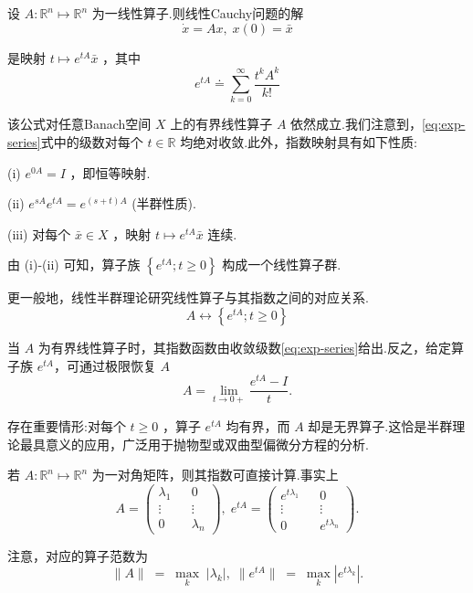 设 $A : {\mathbb{R}}^{n} \mapsto  {\mathbb{R}}^{n}$ 为一线性算子.则线性Cauchy问题的解
\begin{equation}\tag{7.8}\label{eq:linear-ode}
\dot{x} = {Ax},\;x\left( 0\right)  = \bar{x}
\end{equation}

是映射 $t \mapsto  {e}^{tA}\bar{x}$ ，其中
\begin{equation}\tag{7.9}\label{eq:exp-series}
{e}^{tA} \doteq  \mathop{\sum }\limits_{{k = 0}}^{\infty }\frac{{t}^{k}{A}^{k}}{k!}
\end{equation}

该公式对任意Banach空间 $X$ 上的有界线性算子 $A$ 依然成立.我们注意到，\eqref{eq:exp-series}式中的级数对每个 $t \in  \mathbb{R}$ 均绝对收敛.此外，指数映射具有如下性质:

(i) ${e}^{0A} = I$ ，即恒等映射.

(ii) ${e}^{sA}{e}^{tA} = {e}^{\left( {s + t}\right) A}$ (半群性质).

(iii) 对每个 $\bar{x} \in  X$ ，映射 $t \mapsto  {e}^{tA}\bar{x}$ 连续.

由 (i)-(ii) 可知，算子族 $\left\{  {{e}^{tA};t \geq  0}\right\}$ 构成一个线性算子群.

更一般地，线性半群理论研究线性算子与其指数之间的对应关系.
\[
A \leftrightarrow  \left\{  {{e}^{tA};t \geq  0}\right\}
\]

当 $A$ 为有界线性算子时，其指数函数由收敛级数\eqref{eq:exp-series}给出.反之，给定算子族 ${e}^{tA}$，可通过极限恢复 $A$
\[
A = \mathop{\lim }\limits_{{t \rightarrow  0 + }}\frac{{e}^{tA} - I}{t}.
\]

存在重要情形:对每个 $t \geq  0$ ，算子 ${e}^{tA}$ 均有界，而 $A$ 却是无界算子.这恰是半群理论最具意义的应用，广泛用于抛物型或双曲型偏微分方程的分析.

\begin{instance}\label{ins:diagonal-matrix-exponential}
若 $A : {\mathbb{R}}^{n} \mapsto  {\mathbb{R}}^{n}$ 为一对角矩阵，则其指数可直接计算.事实上
\[
A = \left( \begin{matrix} {\lambda }_{1} & & 0 \\  \vdots & & \vdots \\  0 & & {\lambda }_{n} \end{matrix}\right) ,\;{e}^{tA} = \left( \begin{matrix} {e}^{t{\lambda }_{1}} & & 0 \\  \vdots & & \vdots \\  0 & & {e}^{t{\lambda }_{n}} \end{matrix}\right) .
\]

注意，对应的算子范数为
\[
\| A\| \; = \;\mathop{\max }\limits_{k}\;\left| {\lambda }_{k}\right| ,\;\| {e}^{tA}\| \; = \;\mathop{\max }\limits_{k}\left| {e}^{t{\lambda }_{k}}\right| .
\]
\end{instance}

